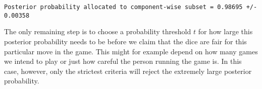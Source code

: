 \documentclass[
  letterpaper,
  DIV=11,
  numbers=noendperiod]{scrartcl}
\newenvironment{Shaded}{\begin{snugshade}}{\end{snugshade}}
\newcommand{\ControlFlowTok}[1]{\textcolor[rgb]{0.00,0.23,0.31}{#1}}
\newcommand{\DecValTok}[1]{\textcolor[rgb]{0.68,0.00,0.00}{#1}}
\newcommand{\FunctionTok}[1]{\textcolor[rgb]{0.28,0.35,0.67}{#1}}
\newcommand{\NormalTok}[1]{\textcolor[rgb]{0.00,0.23,0.31}{#1}}
\newcommand{\OtherTok}[1]{\textcolor[rgb]{0.00,0.23,0.31}{#1}}
\newcommand{\SpecialCharTok}[1]{\textcolor[rgb]{0.37,0.37,0.37}{#1}}
\newcommand{\StringTok}[1]{\textcolor[rgb]{0.13,0.47,0.30}{#1}}
\begin{document}
\begin{Shaded}
\end{Shaded}

\begin{Shaded}
\end{Shaded}

\begin{verbatim}
Posterior probability allocated to component-wise subset = 0.98695 +/- 0.00358
\end{verbatim}

The only remaining step is to choose a probability threshold \(t\) for
how large this posterior probability needs to be before we claim that
the dice are fair for this particular move in the game. This might for
example depend on how many games we intend to play or just how careful
the person running the game is. In this case, however, only the
strictest criteria will reject the extremely large posterior
probability.
\end{document}
